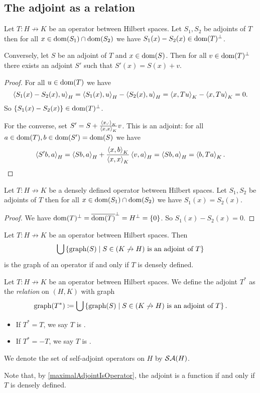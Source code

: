 \subsection{The adjoint as a relation}
\begin{lemma}
Let $T: H\not\to K$ be an operator between Hilbert spaces. Let $S_1, S_2$ be adjoints of $T$ then for all $x\in \operatorname{dom}(S_1)\cap\operatorname{dom}(S_2)$ we have $S_1(x) - S_2(x) \in \operatorname{dom}(T)^\perp$.

Conversely, let $S$ be an adjoint of $T$ and $x\in\operatorname{dom}(S)$. Then for all $v\in \operatorname{dom}(T)^\perp$ there exists an adjoint $S'$ such that $S'(x) = S(x) + v$.
\end{lemma}
\begin{proof}
For all $u\in \operatorname{dom}(T)$ we have
\[ \left\langle S_1(x) - S_2(x), u \right\rangle_H = \left\langle S_1(x), u \right\rangle_H - \left\langle S_2(x), u \right\rangle_H = \left\langle x, Tu \right\rangle_K - \left\langle x, Tu \right\rangle_K = 0. \]
So $\{S_1(x) - S_2(x)\} \in \operatorname{dom}(T)^\perp$.

For the converse, set $S' = S + \frac{\left\langle x,\cdot \right\rangle_K}{\left\langle x,x \right\rangle_K}v$. This is an adjoint: for all $a\in \operatorname{dom}(T), b\in \operatorname{dom}(S') = \operatorname{dom}(S)$ we have
\[  \left\langle S' b,a \right\rangle_H = \left\langle Sb, a \right\rangle_H + \frac{\left\langle x,b \right\rangle_K}{\left\langle x,x \right\rangle_K}\left\langle v,a \right\rangle_H = \left\langle Sb, a \right\rangle_H = \left\langle b,Ta \right\rangle_K. \]
\end{proof}
\begin{corollary} \label{agreementAdjoints}
Let $T: H\not\to K$ be a densely defined operator between Hilbert spaces. Let $S_1, S_2$ be adjoints of $T$ then for all $x\in \operatorname{dom}(S_1)\cap\operatorname{dom}(S_2)$ we have $S_1(x) = S_2(x)$.
\end{corollary}
\begin{proof}
We have $\operatorname{dom}(T)^\perp = \overline{\operatorname{dom}(T)}^\perp = H^\perp = \{0\}$. So $S_1(x) - S_2(x) = 0$.
\end{proof}
\begin{corollary} \label{maximalAdjointIsOperator}
Let $T: H\not\to K$ be an operator between Hilbert spaces. Then
\[ \bigcup\left\{ \operatorname{graph}(S) \;\middle|\; \text{$S\in (K\not\to H)$ is an adjoint of $T$} \right\} \]
is the graph of an operator \textup{if and only if} $T$ is densely defined.
\end{corollary}

\begin{definition}
Let $T: H\not\to K$ be an operator between Hilbert spaces. We define the adjoint $T^*$ as the \emph{relation} on $(H,K)$ with graph
\[ \operatorname{graph}(T^*) \coloneqq \bigcup\left\{ \operatorname{graph}(S) \;\middle|\; \text{$S\in (K\not\to H)$ is an adjoint of $T$} \right\}. \]
\begin{itemize}
\item If $T^* = T$, we say $T$ is .
\item If $T^* = -T$, we say $T$ is .
\end{itemize}
We denote the set of self-adjoint operators on $H$ by $\mathop{\mathcal{SA}}\nolimits(H)$.
\end{definition}
Note that, by \ref{maximalAdjointIsOperator}, the adjoint is a function if and only if $T$ is densely defined.

